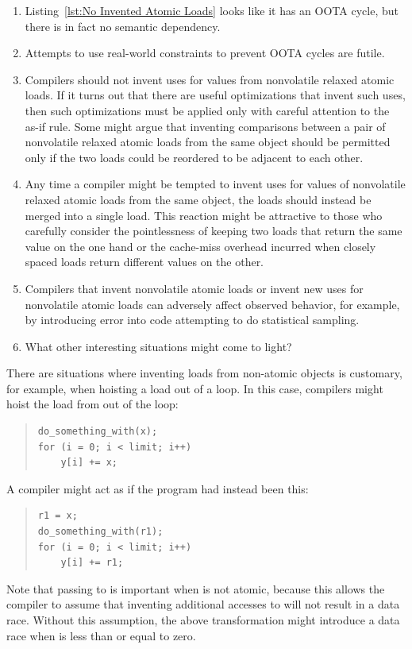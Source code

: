 \documentclass[10]{article}
\begin{document}
\begin{enumerate}
\item	Listing~\ref{lst:No Invented Atomic Loads}
	looks like it has an OOTA cycle, but there is in fact no
	semantic dependency.
\item	Attempts to use real-world constraints to prevent OOTA cycles
	are futile.
\item	Compilers should not invent uses for values from
	nonvolatile relaxed atomic loads.
	If it turns out that there are useful optimizations that invent
	such uses, then such optimizations must be applied only with
	careful attention to the as-if rule.
	Some might argue that inventing comparisons between a pair of
	nonvolatile relaxed atomic loads from the same object should
	be permitted only if the two loads could be reordered to be
	adjacent to each other.
\item	Any time a compiler might be tempted to invent uses for
	values of nonvolatile relaxed atomic loads from the same
	object, the loads should instead be merged into a single load.
	This reaction might be attractive to those who carefully consider
	the pointlessness of keeping two loads that return the same value
	on the one hand or the cache-miss overhead incurred when closely
	spaced loads return different values on the other.
\item	Compilers that invent nonvolatile atomic loads or invent
	new uses for nonvolatile atomic loads can adversely affect
	observed behavior, for example, by introducing error into code
	attempting to do statistical sampling.
\item	What other interesting situations might come to light?
\end{enumerate}

There are situations where inventing loads from non-atomic objects
is customary, for example, when hoisting a load out of a loop.
In this case, compilers might hoist the load from  out of
the loop:
\begin{quote}
\begin{verbatim}
do_something_with(x);
for (i = 0; i < limit; i++)
    y[i] += x;
\end{verbatim}
\end{quote}
A compiler might act as if the program had instead been this:
\begin{quote}
\begin{verbatim}
r1 = x;
do_something_with(r1);
for (i = 0; i < limit; i++)
    y[i] += r1;
\end{verbatim}
\end{quote}
Note that passing  to  is important
when  is not atomic,
because this allows the compiler to assume that inventing additional
accesses to  will not result in a data race.
Without this assumption, the above transformation might introduce a data
race when  is less than or equal to zero.
\end{document}
